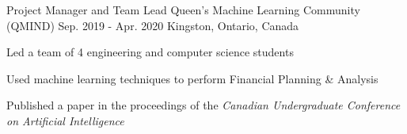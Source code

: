 
\begin{cventries}



  \cventry
    {Project Manager and Team Lead} %
    {Queen's Machine Learning Community (QMIND)} %
    {Sep. 2019 - Apr. 2020} %
    {Kingston, Ontario, Canada} %
    {
      \begin{cvitems} %
        \item{Led a team of 4 engineering and computer science students}
        \item {Used machine learning techniques to perform Financial Planning \& Analysis}
        \item{Published a paper in the proceedings of the \textit{Canadian Undergraduate Conference on Artificial Intelligence}}
      \end{cvitems}
    }


\end{cventries}
